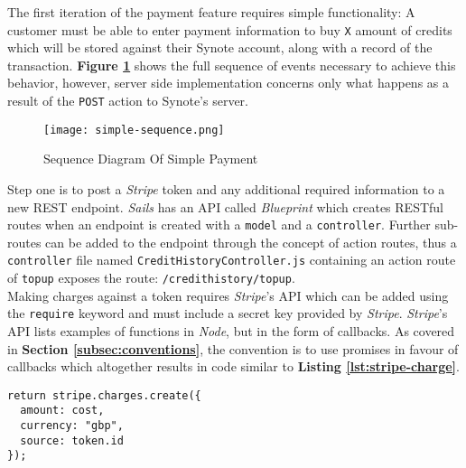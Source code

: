 The first iteration of the payment feature requires simple functionality: A customer must be able to enter payment information to buy \texttt{X} amount of credits which will be stored against their Synote account, along with a record of the transaction. \textbf{Figure \ref{fig:simple-sequence}} shows the full sequence of events necessary to achieve this behavior, however, server side implementation concerns only what happens as a result of the \texttt{POST} action to Synote's server.\\

\begin{figure}[!hbt]
  \centering
 	\texttt{[image: simple-sequence.png]}
  \caption{Sequence Diagram Of Simple Payment}
 	\label{fig:simple-sequence}
\end{figure}

Step one is to post a \textit{Stripe} token and any additional required information to a new REST endpoint. \textit{Sails} has an API called \textit{Blueprint} which creates RESTful routes when an endpoint is created with a \texttt{model} and a \texttt{controller}. Further sub-routes can be added to the endpoint through the concept of action routes, thus a \texttt{controller} file named \texttt{CreditHistoryController.js} containing an action route of \texttt{topup} exposes the route: \texttt{/credithistory/topup}.\\

Making charges against a token requires \textit{Stripe}'s API \cite{stripe-api} which can be added using the \texttt{require} keyword and must include a secret key provided by \textit{Stripe}. \textit{Stripe}'s API lists examples of functions in \textit{Node}, but in the form of callbacks. As covered in \textbf{Section \ref{subsec:conventions}}, the convention is to use promises in favour of callbacks which altogether results in code similar to \textbf{Listing \ref{lst:stripe-charge}}.\\

\hspace{0.1\textwidth}
\begin{minipage}{.76\textwidth}

\begin{listing}[H]
\begin{verbatim}
return stripe.charges.create({
  amount: cost,
  currency: "gbp",
  source: token.id
});
\end{verbatim}
\label{lst:stripe-charge}
\end{listing}
\end{minipage}
\hspace{0.1\textwidth}
\vspace{0.3cm}

